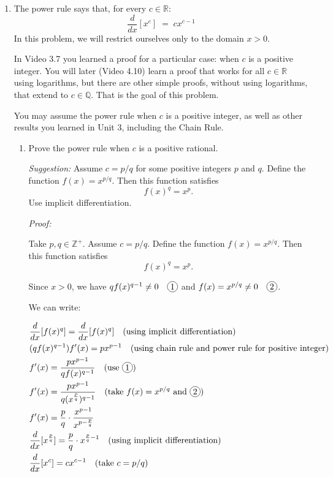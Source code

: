 \documentclass[12pt]{exam}
\newcommand*\circled[1]{\tikz[baseline=(char.base)]{
    \node[shape=circle, draw, inner sep=1pt, 
        minimum height=12pt] (char) {#1};}}
\newcommand{\vv}{\vspace{.4cm}}
\newcommand{\R}{\mathbb{R}}
\newcommand{\Q}{\mathbb{Q}}
\newcommand{\Z}{\mathbb{Z}}
\newcommand*\circled[1]{\tikz[baseline=(char.base)]{
    \node[shape=circle, draw, inner sep=1pt, 
        minimum height=12pt] (char) {#1};}}
\begin{document}
\begin{enumerate}[resume]
\newpage

\item \label{qu:power}  The power rule says that, for every $c \in \R$:
	$$
		\frac{d}{dx} \left[ x^c \right]  \; = \; c x^{c-1}
	$$
In this problem, we will restrict ourselves only to the domain $x>0$.

In Video 3.7 you learned a proof for a particular case: when $c$ is a positive integer.  You will later (Video 4.10) learn a proof that works for all $c \in \R$ using logarithms, but there are other simple proofs, without using logarithms, that extend to $c \in \Q$.  That is the goal of this problem.
	
You may assume the power rule when $c$ is a positive integer, as well as other results you learned in Unit 3, including the Chain Rule.
	\begin{enumerate}
		\item  Prove the power rule when $c$ is a positive rational.
		
		\emph{Suggestion:}  Assume $c=p/q$ for some positive integers $p$ and $q$.    Define the function $f(x)=x^{p/q}$.  Then this function satisfies
			$$
				f(x)^q = x^p.
			$$
			Use implicit differentiation.

		\vv

			
		\emph{Proof: }

		Take $p, q \in \Z^+$. Assume $c=p/q$. Define the function $f(x)=x^{p/q}$.  Then this function satisfies
		$$
			f(x)^q = x^p. 
		$$

		Since $x > 0$, we have $qf(x)^{q - 1} \neq 0 \quad \circled{1}$ and $f(x)=x^{p/q} \neq 0 \quad \circled{2}$.

		We can write:

		\begin{align*}
			& \frac{d}{dx}[f(x)^q] = \frac{d}{dx}[f(x)^q] \quad \mbox{(using implicit differentiation)} \\
			& (qf(x)^{q-1} )f'(x) = px^{p-1}  \quad \mbox{(using chain rule and power rule for positive integer)} \\
			& f'(x) = \frac{px^{p-1}}{qf(x)^{q-1}} \quad \mbox{(use } \circled{1} \mbox{)} \\
			& f'(x) = \frac{px^{p-1}}{q(x^{\frac{p}{q}})^{q-1}} \quad \mbox{(take } f(x)=x^{p/q} \mbox{ and \circled{2})} \\
			& f'(x) = \frac{p}{q} \cdot \frac{x^{p - 1}}{x^{p - \frac{p}{q}}} \\
			& \frac{d}{dx}[x^\frac{p}{q}] = \frac{p}{q} \cdot x^{\frac{p}{q} - 1} \quad \mbox{(using implicit differentiation)} \\
			& \frac{d}{dx}[x^c] = c x^{c-1} \quad \mbox{(take $c=p/q$)}
		\end{align*}


\end{enumerate}
\end{enumerate}
\end{document}
